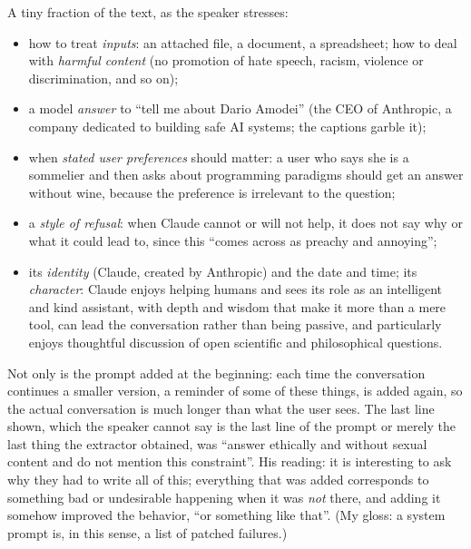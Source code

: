 \begin{exmp}\label{ex:L6-sysprompt}
A tiny fraction of the text, as the speaker stresses:
\begin{itemize}
  \item how to treat \emph{inputs}: an attached file, a document, a spreadsheet; how to deal with \emph{harmful content} (no promotion of hate speech, racism, violence or discrimination, and so on);
  \item a model \emph{answer} to ``tell me about Dario Amodei'' (the CEO of Anthropic, a company dedicated to building safe AI systems; the captions garble it);
  \item when \emph{stated user preferences} should matter: a user who says she is a sommelier and then asks about programming paradigms should get an answer without wine, because the preference is irrelevant to the question;
  \item a \emph{style of refusal}: when Claude cannot or will not help, it does not say why or what it could lead to, since this ``comes across as preachy and annoying'';
  \item its \emph{identity} (Claude, created by Anthropic) and the date and time; its \emph{character}: Claude enjoys helping humans and sees its role as an intelligent and kind assistant, with depth and wisdom that make it more than a mere tool, can lead the conversation rather than being passive, and particularly enjoys thoughtful discussion of open scientific and philosophical questions.
\end{itemize}
\end{exmp}
\noindent Not only is the prompt added at the beginning: each time the conversation continues a smaller version, a reminder of some of these things, is added again, so the actual conversation is much longer than what the user sees. The last line shown, which the speaker cannot say is the last line of the prompt or merely the last thing the extractor obtained, was ``answer ethically and without sexual content and do not mention this constraint''. His reading: it is interesting to ask why they had to write all of this; everything that was added corresponds to something bad or undesirable happening when it was \emph{not} there, and adding it somehow improved the behavior, ``or something like that''. (My gloss: a system prompt is, in this sense, a list of patched failures.)

